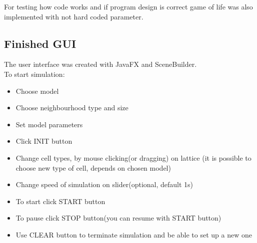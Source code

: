 \documentclass[a4paper, 11pt]{article}
\begin{document}
For testing how code works and if program design is correct game of life was also implemented with not hard coded parameter.


\subsection{Finished GUI}
The user interface was created with JavaFX and SceneBuilder.\\
To start simulation:
\begin{itemize}
\item Choose model
\item Choose neighbourhood type and size
\item Set model parameters
\item Click INIT button
\item Change cell types, by mouse clicking(or dragging) on lattice (it is possible to choose new type of cell, depends on chosen model)
\item Change speed of simulation on slider(optional, default 1s)
\item To start click START button
\item To pause click STOP button(you can resume with START button)
\item Use CLEAR button to terminate simulation and be able to set up a new one

\end{itemize}
\end{document}
